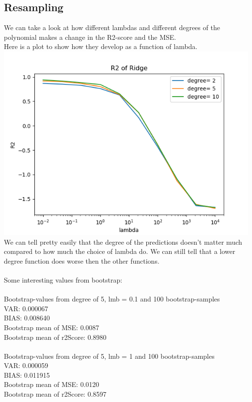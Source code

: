 \documentclass[a4paper,norsk]{article}
\begin{document}
\subsection*{Resampling}
We can take a look at how different lambdas and different degrees of the polynomial makes a change in the R2-score and the MSE.
\\Here is a plot to show how they develop as a function of lambda.
\\ \includegraphics[scale=.7]{R2Ridge}
\\ We can tell pretty easily that the degree of the predictions doesn't matter much compared to how much the choice of lambda do. We can still tell that a lower degree function does worse then the other functions.
\\
\\Some interesting values from bootstrap:
\\
\\Bootstrap-values from degree of 5, lmb = 0.1 and 100 bootstrap-samples
\\VAR: 0.000067
\\BIAS: 0.008640
\\Bootstrap mean of MSE: 0.0087
\\Bootstrap mean of r2Score: 0.8980
\\
\\Bootstrap-values from degree of 5, lmb = 1 and 100 bootstrap-samples
\\VAR: 0.000059
\\BIAS: 0.011915
\\Bootstrap mean of MSE: 0.0120
\\Bootstrap mean of r2Score: 0.8597
\end{document}
